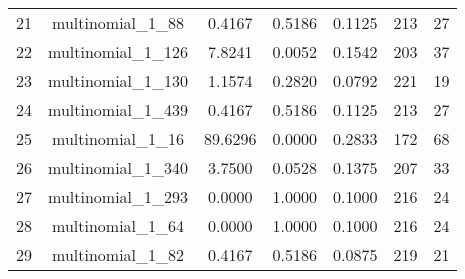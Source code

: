 \begin{table}[!h]
\begin{tabular}{ccccccc}
21 & multinomial\_1\_88 & 0.4167 & 0.5186 & 0.1125 & 213 & 27 \\
22 & multinomial\_1\_126 & 7.8241 & 0.0052 & 0.1542 & 203 & 37 \\
23 & multinomial\_1\_130 & 1.1574 & 0.2820 & 0.0792 & 221 & 19 \\
24 & multinomial\_1\_439 & 0.4167 & 0.5186 & 0.1125 & 213 & 27 \\
25 & multinomial\_1\_16 & 89.6296 & 0.0000 & 0.2833 & 172 & 68 \\
26 & multinomial\_1\_340 & 3.7500 & 0.0528 & 0.1375 & 207 & 33 \\
27 & multinomial\_1\_293 & 0.0000 & 1.0000 & 0.1000 & 216 & 24 \\
28 & multinomial\_1\_64 & 0.0000 & 1.0000 & 0.1000 & 216 & 24 \\
29 & multinomial\_1\_82 & 0.4167 & 0.5186 & 0.0875 & 219 & 21 \\
\bottomrule
\end{tabular}
\end{table}

